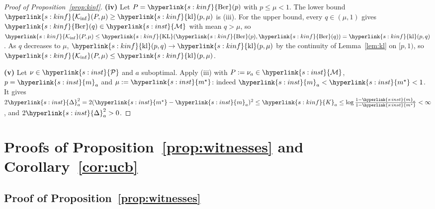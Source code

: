 \documentclass[11pt]{article}
\newcommand{\sy}[2]{{\hyperlink{#1}{#2}}}
\newcommand{\1}{\mathbf{1}}
\newcommand{\Mu}{\sy{s:inst}{\mathcal M}}
\newcommand{\mean}{\sy{s:inst}{m}}
\newcommand{\ms}{\sy{s:inst}{m^\star}}
\newcommand{\Dg}{\sy{s:inst}{\Delta}}
\newcommand{\cP}{\sy{s:inst}{\mathcal P}}
\newcommand{\KL}{\sy{s:kinf}{\mathrm{KL}}}
\newcommand{\Ber}{\sy{s:kinf}{\mathrm{Ber}}}
\newcommand{\kl}{\sy{s:kinf}{\mathrm{kl}}}
\newcommand{\Ki}{\sy{s:kinf}{\mathcal K_{\inf}}}
\newcommand{\Ka}{\sy{s:kinf}{K}}
\begin{document}
\begin{proof}[Proof of Proposition~\ref{prop:kinf}]
\textbf{(iv)} Let $P=\Ber(p)$ with $p\le \mu<1$. The lower bound $\Ki(P,\mu)\ge\kl(p,\mu)$ is (iii). For
the upper bound, every $q\in(\mu,1)$ gives $\Ber(q)\in\Mu$ with mean $q>\mu$, so
$\Ki(P,\mu)\le\KL(\Ber(p),\Ber(q))=\kl(p,q)$. As $q$ decreases to $\mu$, $\kl(p,q)\to\kl(p,\mu)$ by the
continuity of Lemma~\ref{lem:kl} on $[p,1)$, so $\Ki(P,\mu)\le\kl(p,\mu)$.

\textbf{(v)} Let $\nu\in\cP$ and $a$ suboptimal. Apply (iii) with $P:=\nu_a\in\Mu$, $p=\mean_a$ and
$\mu:=\ms$: indeed $\mean_a<\ms<1$. It gives
$2\Dg_a^2=2(\ms-\mean_a)^2\le \Ka_a\le\log\frac{1-\mean_a}{1-\ms}<\infty$, and $2\Dg_a^2>0$.
\end{proof}

\section{Proofs of Proposition~\ref{prop:witnesses} and Corollary~\ref{cor:ucb}}\label{sec:pf-prop:witnesses}

\subsection{Proof of Proposition~\ref{prop:witnesses}}
\end{document}
